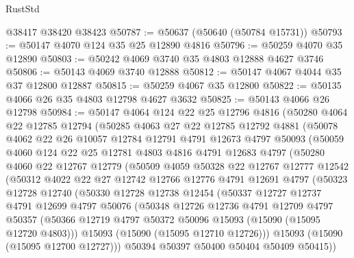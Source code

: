\begin{lexlean}{RustStd}
\begin{coremodule}
    @38417
    @38420
    @38423
@50787 := @50637 (@50640 (@50784 @15731))
@50793 := @50147 @4070 @124 @35 @25 @12890 @4816
@50796 := @50259 @4070 @35 @12890
@50803 := @50242 @4069 @3740 @35 @4803 @12888 @4627 @3746
@50806 := @50143 @4069 @3740 @12888
@50812 := @50147 @4067 @4044 @35 @37 @12800 @12887
@50815 := @50259 @4067 @35 @12800
@50822 := @50135 @4066 @26 @35 @4803 @12798 @4627 @3632
@50825 := @50143 @4066 @26 @12798
@50984 := @50147
    @4064
    @124
    @22
    @25
    @12796
    @4816
    (@50280
      @4064
      @22
      @12785
      @12794
      (@50285
        @4063
        @27
        @22
        @12785
        @12792
        @4881
        (@50078
          @4062
          @22
          @26
          @10057
          @12784
          @12791
          @4791
          @12673
          @4797
          @50093
          (@50059
            @4060
            @124
            @22
            @25
            @12781
            @4803
            @4816
            @4791
            @12683
            @4797
            (@50280
              @4060
              @22
              @12767
              @12779
              (@50509
                @4059
                @50328
                @22
                @12767
                @12777
                @12542
                (@50312
                  @4022
                  @22
                  @27
                  @12742
                  @12766
                  @12776
                  @4791
                  @12691
                  @4797
                  (@50323
                    @12728
                    @12740
                    (@50330
                      @12728
                      @12738
                      @12454
                      (@50337
                        @12727
                        @12737
                        @4791
                        @12699
                        @4797
                        @50076
                        (@50348
                          @12726
                          @12736
                          @4791
                          @12709
                          @4797
                          @50357
                          (@50366 @12719 @4797 @50372 @50096 @15093 (@15090 (@15095 @12720 @4803)))
                          @15093
                          (@15090 (@15095 @12710 @12726)))
                        @15093
                        (@15090 (@15095 @12700 @12727)))
                      @50394
                      @50397
                      @50400
                      @50404
                      @50409
                      @50415))

\end{coremodule}
\end{lexlean}
